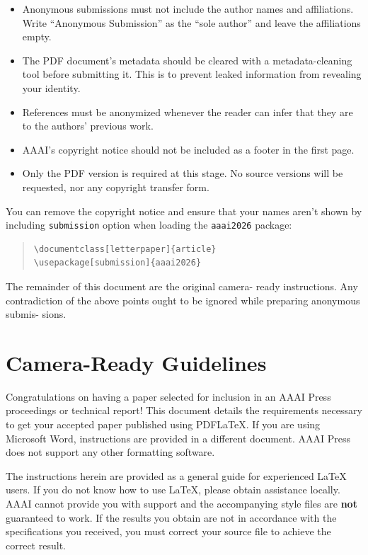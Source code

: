 \documentclass[letterpaper]{article} %
\begin{document}
\begin{itemize}
    \item Anonymous submissions must not include the author names and affiliations. Write ``Anonymous Submission'' as the ``sole author'' and leave the affiliations empty.
    \item The PDF document's metadata should be cleared with a metadata-cleaning tool before submitting it. This is to prevent leaked information from revealing your identity.
    \item References must be anonymized whenever the reader can infer that they are to the authors' previous work.
    \item AAAI's copyright notice should not be included as a footer in the first page.
    \item Only the PDF version is required at this stage. No source versions will be requested, nor any copyright transfer form.
\end{itemize}

You can remove the copyright notice and ensure that your names aren't shown by including \texttt{submission} option when loading the \texttt{aaai2026} package:

\begin{quote}\begin{scriptsize}\begin{verbatim}
\documentclass[letterpaper]{article}
\usepackage[submission]{aaai2026}
\end{verbatim}\end{scriptsize}\end{quote}

The remainder of this document are the original camera-
ready instructions. Any contradiction of the above points
ought to be ignored while preparing anonymous submis-
sions.

\section{Camera-Ready Guidelines}

Congratulations on having a paper selected for inclusion in an AAAI Press proceedings or technical report! This document details the requirements necessary to get your accepted paper published using PDF\LaTeX{}. If you are using Microsoft Word, instructions are provided in a different document. AAAI Press does not support any other formatting software.

The instructions herein are provided as a general guide for experienced \LaTeX{} users. If you do not know how to use \LaTeX{}, please obtain assistance locally. AAAI cannot provide you with support and the accompanying style files are \textbf{not} guaranteed to work. If the results you obtain are not in accordance with the specifications you received, you must correct your source file to achieve the correct result.
\end{document}
